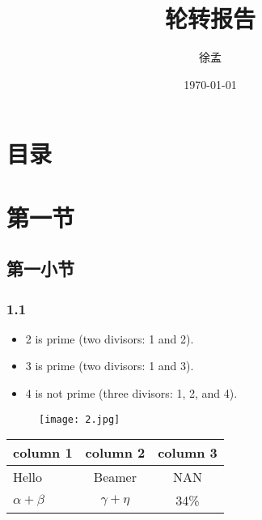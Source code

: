 \documentclass[UTF8,table]{ctexbeamer}
\begin{document}
	\title{轮转报告} 
	\author[Xum]{徐孟}	
	\date{\today}
\frame{\titlepage}

\section*{目录}

\section{第一节}

\subsection{第一小节}

\begin{frame}
	\frametitle{1.1}
	\begin{itemize}
		\item 2 is prime (two divisors: 1 and 2).
		\pause
		\item 3 is prime (two divisors: 1 and 3).
		\pause
		\item 4 is not prime (\alert{three} divisors: 1, 2, and 4).
	\end{itemize}
\end{frame}

\begin{frame}
	\begin{figure}[tb]
		\centering
		\texttt{[image: 2.jpg]}
	\end{figure}	
\end{frame}

\begin{frame}
\begin{table}[tb]
	\centering
	\begin{tabular}{lcc} \hline
		\rowcolor{blue!30}
		\textbf{column 1} & \textbf{column 2} & \textbf{column 3} \\ \hline
		Hello & Beamer & NAN \\ \hline
		$\alpha+\beta$ & $\gamma+\eta$ & 34\% \\ \hline
	\end{tabular}
\end{table}
\end{frame}
\end{document}
